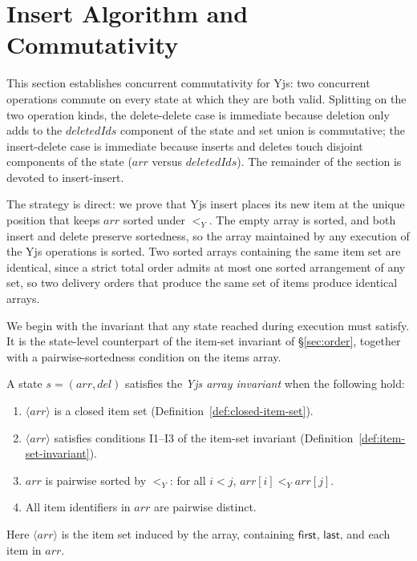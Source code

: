\documentclass[sigplan,screen]{acmart}
\newcommand{\leanref}[1]{\texttt{#1}}
\newcommand{\YjsLt}{\mathrel{<_Y}}
\newcommand{\First}{\mathsf{first}}
\newcommand{\Last}{\mathsf{last}}
\begin{document}
\section{Insert Algorithm and Commutativity}
\label{sec:algorithm}

This section establishes concurrent commutativity for Yjs: two concurrent
operations commute on every state at which they are both valid.  Splitting
on the two operation kinds, the delete-delete case is immediate because
deletion only adds to the $\mathit{deletedIds}$ component of the state and
set union is commutative; the insert-delete case is immediate because
inserts and deletes touch disjoint components of the state ($\mathit{arr}$
versus $\mathit{deletedIds}$).  The remainder of the section is devoted to
insert-insert.

The strategy is direct: we prove that Yjs insert places its new item at
the unique position that keeps $\mathit{arr}$ sorted under $\YjsLt$.  The
empty array is sorted, and both insert and delete preserve sortedness, so
the array maintained by any execution of the Yjs operations is sorted.
Two sorted arrays containing the same item set are identical, since a
strict total order admits at most one sorted arrangement of any set, so
two delivery orders that produce the same set of items produce identical
arrays.

We begin with the invariant that any state reached during execution must
satisfy.  It is the state-level counterpart of the item-set invariant of
\S\ref{sec:order}, together with a pairwise-sortedness condition on the
items array.

\begin{definition}[State invariant (\leanref{YjsArrInvariant})]
\label{def:state-inv}
A state $s = (\mathit{arr}, \mathit{del})$ satisfies the \emph{Yjs array
invariant} when the following hold:
\begin{enumerate}
\item $\langle \mathit{arr} \rangle$ is a closed item set
  (Definition~\ref{def:closed-item-set}).
\item $\langle \mathit{arr} \rangle$ satisfies conditions I1--I3 of the
  item-set invariant (Definition~\ref{def:item-set-invariant}).
\item $\mathit{arr}$ is pairwise sorted by $\YjsLt$:
  for all $i < j$, $\mathit{arr}[i] \YjsLt \mathit{arr}[j]$.
\item All item identifiers in $\mathit{arr}$ are pairwise distinct.
\end{enumerate}
Here $\langle \mathit{arr} \rangle$ is the item set induced by the array,
containing $\First$, $\Last$, and each item in $\mathit{arr}$.
\end{definition}
\end{document}
